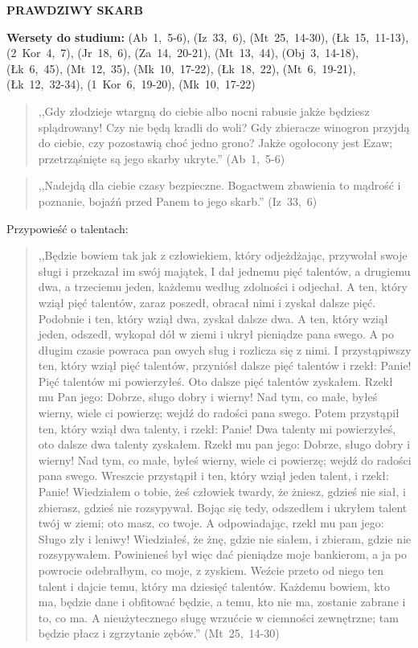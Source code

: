 \documentclass[10pt,a4paper,oneside]{article}
\begin{document}
\centerline{\textbf{\MakeUppercase{Prawdziwy skarb}}}
\begin{center}
\textbf{Wersety do studium:} (Ab~1,~5-6), (Iz~33,~6), (Mt~25,~14-30), (Łk~15,~11-13), (2~Kor~4,~7), (Jr~18,~6), (Za~14,~20-21), (Mt~13,~44), (Obj~3,~14-18), (Łk~6,~45), (Mt~12,~35), (Mk~10,~17-22), (Łk~18,~22), (Mt~6,~19-21), (Łk~12,~32-34), (1~Kor~6,~19-20), (Mk~10,~17-22)
\end{center}
\begin{quote}
,,Gdy złodzieje wtargną do ciebie albo nocni rabusie jakże będziesz splądrowany! Czy nie będą kradli do woli? Gdy zbieracze winogron przyjdą do ciebie, czy pozostawią choć jedno grono? Jakże ogołocony jest Ezaw; przetrząśnięte są jego skarby ukryte.'' (Ab~1,~5-6)
\end{quote}
\begin{quote}
,,Nadejdą dla ciebie czasy bezpieczne. Bogactwem zbawienia to mądrość i poznanie, bojaźń przed Panem to jego skarb.'' (Iz~33,~6)
\end{quote}

Przypowieść o talentach:
\begin{quote}
,,Będzie bowiem tak jak z człowiekiem, który odjeżdżając, przywołał swoje sługi i przekazał im swój majątek, I dał jednemu pięć talentów, a drugiemu dwa, a trzeciemu jeden, każdemu według zdolności i odjechał. A ten, który wziął pięć talentów, zaraz poszedł, obracał nimi i zyskał dalsze pięć. Podobnie i ten, który wziął dwa, zyskał dalsze dwa. A ten, który wziął jeden, odszedł, wykopał dół w ziemi i ukrył pieniądze pana swego. A po długim czasie powraca pan owych sług i rozlicza się z nimi. I przystąpiwszy ten, który wziął pięć talentów, przyniósł dalsze pięć talentów i rzekł: Panie! Pięć talentów mi powierzyłeś. Oto dalsze pięć talentów zyskałem. Rzekł mu Pan jego: Dobrze, sługo dobry i wierny! Nad tym, co małe, byłeś wierny, wiele ci powierzę; wejdź do radości pana swego. Potem przystąpił ten, który wziął dwa talenty, i rzekł: Panie! Dwa talenty mi powierzyłeś, oto dalsze dwa talenty zyskałem. Rzekł mu pan jego: Dobrze, sługo dobry i wierny! Nad tym, co małe, byłeś wierny, wiele ci powierzę; wejdź do radości pana swego. Wreszcie przystąpił i ten, który wziął jeden talent, i rzekł: Panie! Wiedziałem o tobie, żeś człowiek twardy, że żniesz, gdzieś nie siał, i zbierasz, gdzieś nie rozsypywał. Bojąc się tedy, odszedłem i ukryłem talent twój w ziemi; oto masz, co twoje. A odpowiadając, rzekł mu pan jego: Sługo zły i leniwy! Wiedziałeś, że żnę, gdzie nie siałem, i zbieram, gdzie nie rozsypywałem. Powinieneś był więc dać pieniądze moje bankierom, a ja po powrocie odebrałbym, co moje, z zyskiem. Weźcie przeto od niego ten talent i dajcie temu, który ma dziesięć talentów. Każdemu bowiem, kto ma, będzie dane i obfitować będzie, a temu, kto nie ma, zostanie zabrane i to, co ma. A nieużytecznego sługę wrzućcie w ciemności zewnętrzne; tam będzie płacz i zgrzytanie zębów.'' (Mt~25,~14-30)
\end{quote}
\end{document}
